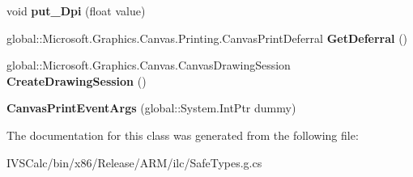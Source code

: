 \begin{DoxyCompactItemize}
void {\bfseries put\+\_\+\+Dpi} (float value)
\item 
\mbox{\label{class_microsoft_1_1_graphics_1_1_canvas_1_1_printing_1_1_canvas_print_event_args_a2e052fa5533258995ffc08b251a211d5}} 
global\+::\+Microsoft.\+Graphics.\+Canvas.\+Printing.\+Canvas\+Print\+Deferral {\bfseries Get\+Deferral} ()
\item 
\mbox{\label{class_microsoft_1_1_graphics_1_1_canvas_1_1_printing_1_1_canvas_print_event_args_a02bc922ffbfd6f4208853d6a3a2f0f4e}} 
global\+::\+Microsoft.\+Graphics.\+Canvas.\+Canvas\+Drawing\+Session {\bfseries Create\+Drawing\+Session} ()
\item 
\mbox{\label{class_microsoft_1_1_graphics_1_1_canvas_1_1_printing_1_1_canvas_print_event_args_ab71de59113b5cb4d0d36f0a663ad75b5}} 
{\bfseries Canvas\+Print\+Event\+Args} (global\+::\+System.\+Int\+Ptr dummy)
\end{DoxyCompactItemize}


The documentation for this class was generated from the following file\+:\begin{DoxyCompactItemize}
\item 
I\+V\+S\+Calc/bin/x86/\+Release/\+A\+R\+M/ilc/Safe\+Types.\+g.\+cs\end{DoxyCompactItemize}
